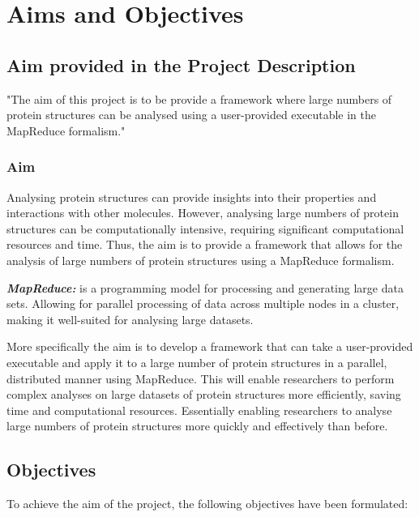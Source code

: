 \documentclass[]{final_report}
\begin{document}
\section{Aims and Objectives}
\subsection{Aim provided in the Project Description}
"The aim of this project is to be provide a framework where large numbers of protein structures can be analysed using a user-provided executable in the MapReduce formalism."

\subsubsection{Aim}
Analysing protein structures can provide insights into their properties and interactions with other molecules. However, analysing large numbers of protein structures can be computationally intensive, requiring significant computational resources and time. Thus, the aim is to provide a framework that allows for the analysis of large numbers of protein structures using a MapReduce formalism.

\textbf{\textit{MapReduce:}} is a programming model for processing and generating large data sets. Allowing for parallel processing of data across multiple nodes in a cluster, making it well-suited for analysing large datasets.

More specifically the aim is to develop a framework that can take a user-provided executable and apply it to a large number of protein structures in a parallel, distributed manner using MapReduce. This will enable researchers to perform complex analyses on large datasets of protein structures more efficiently, saving time and computational resources. Essentially enabling researchers to analyse large numbers of protein structures more quickly and effectively than before.
\clearpage

\subsection{Objectives}

To achieve the aim of the project, the following objectives have been formulated:
\end{document}
